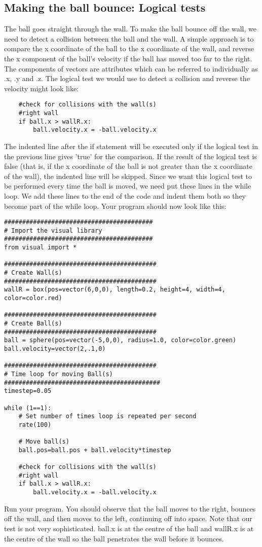 \documentclass[12pt]{article}
\begin{document}
\subsection{Making the ball bounce: Logical tests}
The ball goes straight through the wall.
To make the ball bounce off the wall, we need to detect a collision between the ball and the wall.
A simple approach is to compare the x coordinate of the ball to the x coordinate of the wall,
and reverse the x component of the ball's velocity if the ball has moved too far to the right.
The components of vectors are attributes which can be referred to individually as .x, .y and .z.
The logical test we would use to detect a collision and reverse the velocity might look like:
{\color{code}
\begin{verbatim}
    #check for collisions with the wall(s)
    #right wall
    if ball.x > wallR.x:
        ball.velocity.x = -ball.velocity.x
\end{verbatim}}
The indented line after the if statement will be executed only if the
logical test in the previous line gives 'true' for the comparison.
If the result of the logical test is false
(that is, if the x coordinate of the ball is not greater than the x coordinate of the wall),
the indented line will be skipped.
Since we want this logical test to be performed every time the ball is moved,
we need put these lines in the while loop. We add these lines to the end of the code and indent them both so they become part of the while loop.
Your program should now look like this:
{\color{code}\begin{verbatim}
#########################################
# Import the visual library
#########################################
from visual import *

##########################################
# Create Wall(s)
##########################################
wallR = box(pos=vector(6,0,0), length=0.2, height=4, width=4, color=color.red)

##########################################
# Create Ball(s)
##########################################
ball = sphere(pos=vector(-5,0,0), radius=1.0, color=color.green)
ball.velocity=vector(2,.1,0)

##########################################
# Time loop for moving Ball(s)
###########################################
timestep=0.05

while (1==1):
    # Set number of times loop is repeated per second
    rate(100)

    # Move ball(s)
    ball.pos=ball.pos + ball.velocity*timestep

    #check for collisions with the wall(s)
    #right wall
    if ball.x > wallR.x:
        ball.velocity.x = -ball.velocity.x
\end{verbatim}}
Run your program.
You should observe that the ball moves to the right, bounces off the wall,
and then moves to the left, continuing off into space.
Note that our test is not very sophisticated.
{\color{code}ball.x} is at the centre of the ball
and {\color{code}wallR.x} is at the centre of the wall so the ball penetrates the wall before it bounces.
\end{document}

